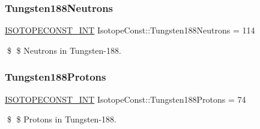 \subsubsection{\texorpdfstring{Tungsten188\+Neutrons}{Tungsten188Neutrons}}
{\footnotesize\ttfamily \mbox{\hyperlink{group___isotope_const-_macros_ga5f18360b3e99483a35c32d789e62621c}{I\+S\+O\+T\+O\+P\+E\+C\+O\+N\+S\+T\+\_\+\+I\+NT}} Isotope\+Const\+::\+Tungsten188\+Neutrons = 114}

\$ \$ Neutrons in Tungsten-\/188. \mbox{\label{group___isotope_const-_tungsten-_w188_ga5f7c8d92fad0ed0a388af2ffe9a3fd68}} 
\subsubsection{\texorpdfstring{Tungsten188\+Protons}{Tungsten188Protons}}
{\footnotesize\ttfamily \mbox{\hyperlink{group___isotope_const-_macros_ga5f18360b3e99483a35c32d789e62621c}{I\+S\+O\+T\+O\+P\+E\+C\+O\+N\+S\+T\+\_\+\+I\+NT}} Isotope\+Const\+::\+Tungsten188\+Protons = 74}

\$ \$ Protons in Tungsten-\/188. 